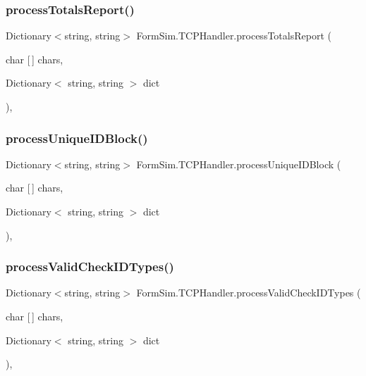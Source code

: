 \subsubsection{\texorpdfstring{process\+Totals\+Report()}{processTotalsReport()}}
{\footnotesize\ttfamily Dictionary$<$string, string$>$ Form\+Sim.\+T\+C\+P\+Handler.\+process\+Totals\+Report (\begin{DoxyParamCaption}\item[{char \mbox{[}$\,$\mbox{]}}]{chars,  }\item[{Dictionary$<$ string, string $>$}]{dict }\end{DoxyParamCaption})\hspace{0.3cm}{\ttfamily [inline]}, {\ttfamily [private]}}

\mbox{\label{class_form_sim_1_1_t_c_p_handler_ac1914cfaa1d821983139e6af9a0ab79c}} 
\subsubsection{\texorpdfstring{process\+Unique\+I\+D\+Block()}{processUniqueIDBlock()}}
{\footnotesize\ttfamily Dictionary$<$string, string$>$ Form\+Sim.\+T\+C\+P\+Handler.\+process\+Unique\+I\+D\+Block (\begin{DoxyParamCaption}\item[{char \mbox{[}$\,$\mbox{]}}]{chars,  }\item[{Dictionary$<$ string, string $>$}]{dict }\end{DoxyParamCaption})\hspace{0.3cm}{\ttfamily [inline]}, {\ttfamily [private]}}

\mbox{\label{class_form_sim_1_1_t_c_p_handler_a8f376aac84832a975e0a9334e2c208c5}} 
\subsubsection{\texorpdfstring{process\+Valid\+Check\+I\+D\+Types()}{processValidCheckIDTypes()}}
{\footnotesize\ttfamily Dictionary$<$string, string$>$ Form\+Sim.\+T\+C\+P\+Handler.\+process\+Valid\+Check\+I\+D\+Types (\begin{DoxyParamCaption}\item[{char \mbox{[}$\,$\mbox{]}}]{chars,  }\item[{Dictionary$<$ string, string $>$}]{dict }\end{DoxyParamCaption})\hspace{0.3cm}{\ttfamily [inline]}, {\ttfamily [private]}}

